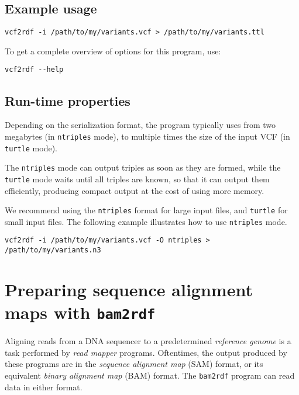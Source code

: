 \subsection{Example usage}

\begin{siderules}
\begin{verbatim}
vcf2rdf -i /path/to/my/variants.vcf > /path/to/my/variants.ttl
\end{verbatim}
\end{siderules}

To get a complete overview of options for this program, use:
\begin{siderules}
\begin{verbatim}
vcf2rdf --help
\end{verbatim}
\end{siderules}

\subsection{Run-time properties}

  Depending on the serialization format, the program typically uses from two megabytes
  (in \texttt{ntriples} mode), to multiple times the size of the input VCF
  (in \texttt{turtle} mode).

  The \texttt{ntriples} mode can output triples as soon as they are formed, while the
  \texttt{turtle} mode waits until all triples are known, so that it can output them
  efficiently, producing compact output at the cost of using more memory.

  We recommend using the \texttt{ntriples} format for large input files, and
  \texttt{turtle} for small input files.  The following example illustrates how to
  use \texttt{ntriples} mode.

\begin{siderules}
\begin{verbatim}
vcf2rdf -i /path/to/my/variants.vcf -O ntriples > /path/to/my/variants.n3
\end{verbatim}
\end{siderules}

\section{Preparing sequence alignment maps with \texttt{bam2rdf}}

  Aligning reads from a DNA sequencer to a predetermined \emph{reference genome}
  is a task performed by \emph{read mapper} programs.  Oftentimes, the output
  produced by these programs are in the \emph{sequence alignment map} (SAM) format,
  or its equivalent \emph{binary alignment map} (BAM) format.  The \texttt{bam2rdf}
  program can read data in either format.

